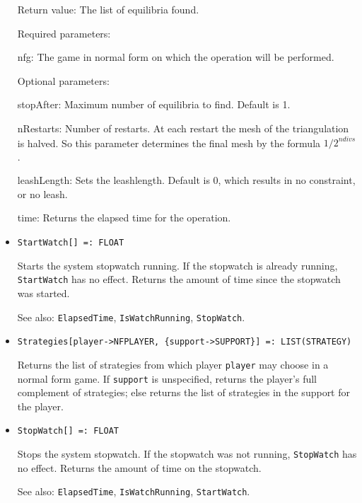 \begin{itemize}
\item
[Return value:] The list of equilibria found.
\item
[Required parameters:]\hfil\null

\bd
\item
[nfg:] The game in normal form on which the operation will be
performed.
\ed

\item
[Optional parameters:]\hfil\null
	
\bd
\item
[stopAfter:] Maximum number of equilibria to find. Default is 1.  
\item 
[nRestarts:] Number of restarts.  At each restart the mesh of the
triangulation is halved.  So this parameter determines the final mesh
by the formula ${1/2}^{ndivs}$.
\item
[leashLength:] Sets the leashlength. Default is 0, which results in no
constraint, or no leash.  
\item
[time:] Returns the elapsed time for the operation.
\ed
\ed

\item
\protect \large \begin{verbatim}
StartWatch[] =: FLOAT
\end{verbatim}\normalsize

\bd
Starts the system stopwatch running.  If the stopwatch
is already running, {\tt StartWatch} has no effect.  Returns the amount
of time since the stopwatch was started.
\item
[See also:] {\tt ElapsedTime}, {\tt IsWatchRunning}, {\tt StopWatch}.
\ed

\item
\protect \large \begin{verbatim}
Strategies[player->NFPLAYER, {support->SUPPORT}] =: LIST(STRATEGY)
\end{verbatim}\normalsize

\bd
Returns the list of strategies from which player \verb+player+ may choose
in a normal form game.  If \verb+support+ is unspecified, returns the
player's full complement of strategies; else returns the list of strategies
in the support for the player.
\ed

\item
\protect \large \begin{verbatim}
StopWatch[] =: FLOAT
\end{verbatim}\normalsize

\bd
Stops the system stopwatch.  If the stopwatch was not
running, {\tt StopWatch} has no effect.  Returns the amount of time
on the stopwatch.
\item
[See also:] {\tt ElapsedTime}, {\tt IsWatchRunning}, {\tt StartWatch}.
\ed


\end{itemize}
